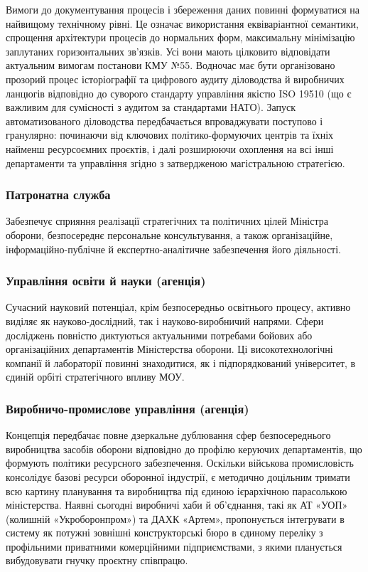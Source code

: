 Вимоги до документування процесів і збереження даних повинні формуватися на найвищому технічному рівні. Це означає використання еквіваріантної семантики, спрощення архітектури процесів до нормальних форм, максимальну мінімізацію заплутаних горизонтальних зв'язків. Усі вони мають цілковито відповідати актуальним вимогам постанови КМУ №55. Водночас має бути організовано прозорий процес історіографії та цифрового аудиту діловодства й виробничих ланцюгів відповідно до суворого стандарту управління якістю ISO 19510 (що є важливим для сумісності з аудитом за стандартами НАТО). Запуск автоматизованого діловодства передбачається впроваджувати поступово і гранулярно: починаючи від ключових політико-формуючих центрів та їхніх найменш ресурсоємних проєктів, і далі розширюючи охоплення на всі інші департаменти та управління згідно з затвердженою магістральною стратегією.

\subsubsection{Патронатна служба}

Забезпечує сприяння реалізації стратегічних та політичних цілей Міністра оборони, безпосереднє персональне консультування, а також організаційне, інформаційно-публічне й експертно-аналітичне забезпечення його діяльності.

\subsubsection{Управління освіти й науки (агенція)}

Сучасний науковий потенціал, крім безпосередньо освітнього процесу, активно виділяє як науково-дослідний, так і науково-виробничий напрями. Сфери досліджень повністю диктуються актуальними потребами бойових або організаційних департаментів Міністерства оборони. Ці високотехнологічні компанії й лабораторії повинні знаходитися, як і підпорядкований університет, в єдиній орбіті стратегічного впливу МОУ.

\subsubsection{Виробничо-промислове управління (агенція)}

Концепція передбачає повне дзеркальне дублювання сфер безпосереднього виробництва засобів оборони відповідно до профілю керуючих департаментів, що формують політики ресурсного забезпечення. Оскільки військова промисловість консолідує базові ресурси оборонної індустрії, є методично доцільним тримати всю картину планування та виробництва під єдиною ієрархічною парасолькою міністерства. Наявні сьогодні виробничі хаби й об'єднання, такі як АТ «УОП» (колишній «Укроборонпром») та ДАХК «Артем», пропонується інтегрувати в систему як потужні зовнішні конструкторські бюро в єдиному переліку з профільними приватними комерційними підприємствами, з якими планується вибудовувати гнучку проєктну співпрацю.

